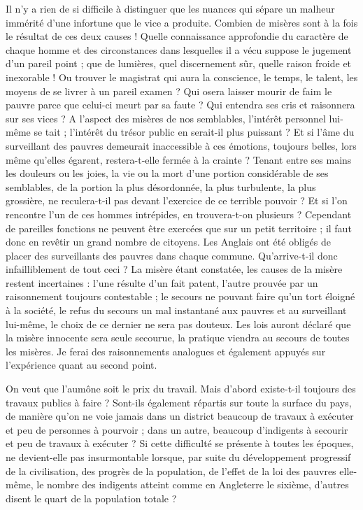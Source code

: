 \documentclass[french,twoside]{book} %
\begin{document}
Il n’y a rien de si difficile à distinguer que les nuances qui sépare un malheur immérité d’une infortune que le vice a produite. Combien de misères sont à la fois le résultat de ces deux causes ! Quelle connaissance approfondie du caractère de chaque homme et des circonstances dans lesquelles il a vécu suppose le jugement d’un pareil point ; que de lumières, quel discernement sûr, quelle raison froide et inexorable ! Ou trouver le magistrat qui aura la conscience, le temps, le talent, les moyens de se livrer à un pareil examen ? Qui osera laisser mourir de faim le pauvre parce que celui-ci meurt par sa faute ? Qui entendra ses cris et raisonnera sur ses vices ? A l’aspect des misères de nos semblables, l’intérêt personnel lui-même se tait ; l’intérêt du trésor public en serait-il plus puissant ? Et si l’âme du surveillant des pauvres demeurait inaccessible à ces émotions, toujours belles, lors même qu’elles égarent, restera-t-elle fermée à la crainte ? Tenant entre ses mains les douleurs ou les joies, la vie ou la mort d’une portion considérable de ses semblables, de la portion la plus désordonnée, la plus turbulente, la plus grossière, ne reculera-t-il pas devant l’exercice de ce terrible pouvoir ? Et si l’on rencontre l’un de ces hommes intrépides, en trouvera-t-on plusieurs ? Cependant de pareilles fonctions ne peuvent être exercées que sur un petit territoire ; il faut donc en revêtir un grand nombre de citoyens. Les Anglais ont été obligés de placer des surveillants des pauvres dans chaque commune. Qu'arrive-t-il donc infailliblement de tout ceci ? La misère étant constatée, les causes de la misère restent incertaines : l’une résulte d’un fait patent, l’autre prouvée par un raisonnement toujours contestable ; le secours ne pouvant faire qu’un tort éloigné à la société, le refus du secours un mal instantané aux pauvres et au surveillant lui-même, le choix de ce dernier ne sera pas douteux. Les lois auront déclaré que la misère innocente sera seule secourue, la pratique viendra au secours de toutes les misères. Je ferai des raisonnements analogues et également appuyés sur l’expérience quant au second point.\par
\bigbreak
\noindent On veut que l’aumône soit le prix du travail. Mais d’abord existe-t-il toujours des travaux publics à faire ? Sont-ils également répartis sur toute la surface du pays, de manière qu’on ne voie jamais dans un district beaucoup de travaux à exécuter et peu de personnes à pourvoir ; dans un autre, beaucoup d’indigents à secourir et peu de travaux à exécuter ? Si cette difficulté se présente à toutes les époques, ne devient-elle pas insurmontable lorsque, par suite du développement progressif de la civilisation, des progrès de la population, de l’effet de la loi des pauvres elle-même, le nombre des indigents atteint comme en Angleterre le sixième, d’autres disent le quart de la population totale ?\par
\end{document}
